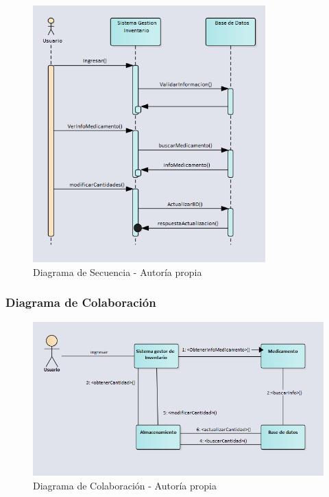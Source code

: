 \begin{center}
    \begin{figure}[htb]
        \centering
        \includegraphics[width = 0.8\textwidth] {libro/capitulo5/img/Secuencia.PNG}
        \caption{Diagrama de Secuencia - Autor\'ia propia}
        \label{fig:my_label}
    \end{figure}
\end{center}

\newpage


\subsubsection{ Diagrama de Colaboración}
\begin{center}
    \begin{figure}[htb]
        \centering
        \includegraphics[width = 1.2\textwidth] {libro/capitulo5/img/Colaboracion.PNG}
        \caption{Diagrama de Colaboración - Autor\'ia propia}
        \label{fig:my_label}
    \end{figure}
\end{center}
\newpage

